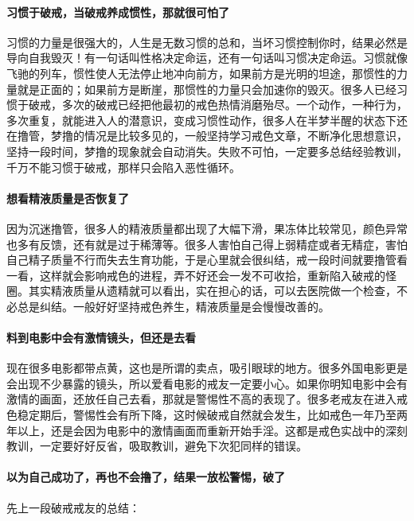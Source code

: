 \paragraph{习惯于破戒，当破戒养成惯性，那就很可怕了}

习惯的力量是很强大的，人生是无数习惯的总和，当坏习惯控制你时，结果必然是导向自我毁灭！有一句话叫性格决定命运，还有一句话叫习惯决定命运。习惯就像飞驰的列车，惯性使人无法停止地冲向前方，如果前方是光明的坦途，那惯性的力量就是正面的；如果前方是断崖，那惯性的力量只会加速你的毁灭。很多人已经习惯于破戒，多次的破戒已经把他最初的戒色热情消磨殆尽。一个动作，一种行为，多次重复，就能进入人的潜意识，变成习惯性动作，很多人在半梦半醒的状态下还在撸管，梦撸的情况是比较多见的，一般坚持学习戒色文章，不断净化思想意识，坚持一段时间，梦撸的现象就会自动消失。失败不可怕，一定要多总结经验教训，千万不能习惯于破戒，那样只会陷入恶性循环。

\paragraph{想看精液质量是否恢复了}

因为沉迷撸管，很多人的精液质量都出现了大幅下滑，果冻体比较常见，颜色异常也多有反馈，还有就是过于稀薄等。很多人害怕自己得上弱精症或者无精症，害怕自己精子质量不行而失去生育功能，于是心里就会很纠结，戒一段时间就要撸管看一看，这样就会影响戒色的进程，弄不好还会一发不可收拾，重新陷入破戒的怪圈。其实精液质量从遗精就可以看出，实在担心的话，可以去医院做一个检查，不必总是纠结。一般好好坚持戒色养生，精液质量是会慢慢改善的。

\paragraph{料到电影中会有激情镜头，但还是去看}

现在很多电影都带点黄，这也是所谓的卖点，吸引眼球的地方。很多外国电影更是会出现不少暴露的镜头，所以爱看电影的戒友一定要小心。如果你明知电影中会有激情的画面，还放任自己去看，那就是警惕性不高的表现了。很多老戒友在进入戒色稳定期后，警惕性会有所下降，这时候破戒自然就会发生，比如戒色一年乃至两年以上，还是会因为电影中的激情画面而重新开始手淫。这都是戒色实战中的深刻教训，一定要好好反省，吸取教训，避免下次犯同样的错误。

\paragraph{以为自己成功了，再也不会撸了，结果一放松警惕，破了}

先上一段破戒戒友的总结：

